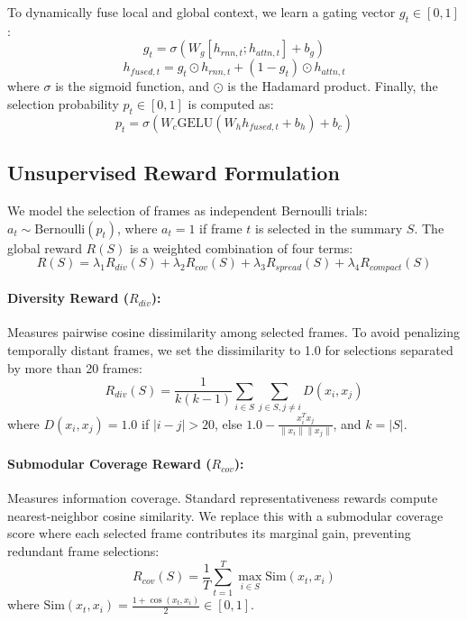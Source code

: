 \documentclass[letterpaper]{article} %
\begin{document}
To dynamically fuse local and global context, we learn a gating vector $g_t \in [0, 1]$:
\begin{equation}
    g_t = \sigma(W_g [h_{rnn,t} ; h_{attn,t}] + b_g)
\end{equation}
\begin{equation}
    h_{fused,t} = g_t \odot h_{rnn,t} + (1 - g_t) \odot h_{attn,t}
\end{equation}
where $\sigma$ is the sigmoid function, and $\odot$ is the Hadamard product. Finally, the selection probability $p_t \in [0, 1]$ is computed as:
\begin{equation}
    p_t = \sigma(W_c \text{GELU}(W_h h_{fused,t} + b_h) + b_c)
\end{equation}

\subsection{Unsupervised Reward Formulation}
We model the selection of frames as independent Bernoulli trials: $a_t \sim \text{Bernoulli}(p_t)$, where $a_t = 1$ if frame $t$ is selected in the summary $S$. The global reward $R(S)$ is a weighted combination of four terms:
\begin{equation}
    R(S) = \lambda_1 R_{div}(S) + \lambda_2 R_{cov}(S) + \lambda_3 R_{spread}(S) + \lambda_4 R_{compact}(S)
\end{equation}

\paragraph{Diversity Reward ($R_{div}$):} Measures pairwise cosine dissimilarity among selected frames. To avoid penalizing temporally distant frames, we set the dissimilarity to 1.0 for selections separated by more than 20 frames:
\begin{equation}
    R_{div}(S) = \frac{1}{k(k-1)} \sum_{i \in S} \sum_{j \in S, j \ne i} D(x_i, x_j)
\end{equation}
where $D(x_i, x_j) = 1.0$ if $|i - j| > 20$, else $1.0 - \frac{x_i^T x_j}{\|x_i\| \|x_j\|}$, and $k = |S|$.

\paragraph{Submodular Coverage Reward ($R_{cov}$):} Measures information coverage. Standard representativeness rewards compute nearest-neighbor cosine similarity. We replace this with a submodular coverage score where each selected frame contributes its marginal gain, preventing redundant frame selections:
\begin{equation}
    R_{cov}(S) = \frac{1}{T} \sum_{t=1}^T \max_{i \in S} \text{Sim}(x_t, x_i)
\end{equation}
where $\text{Sim}(x_t, x_i) = \frac{1 + \cos(x_t, x_i)}{2} \in [0, 1]$.
\end{document}
